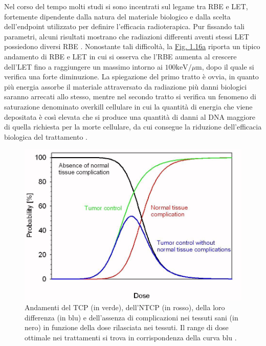 \documentclass[12pt,a4paper,twoside]{report}
\begin{document}
	Nel corso del tempo molti studi si sono incentrati sul legame tra RBE e LET, fortemente dipendente dalla natura del materiale biologico e dalla scelta dell'endpoint utilizzato per definire l'efficacia radioterapica. Pur fissando tali parametri, alcuni risultati mostrano che radiazioni differenti aventi stessi LET possiedono diversi RBE \cite{jicru}. Nonostante tali difficoltà, la \hyperref[fig:let_rbe]{Fig. 1.16a} riporta un tipico andamento di RBE e LET in cui si osserva che l'RBE aumenta al crescere dell'LET fino a raggiungere un massimo intorno ai $100\mbox{keV}/\mu\mbox{m}$, dopo il quale si verifica una forte diminuzione. La spiegazione del primo tratto è ovvia, in quanto più energia assorbe il materiale attraversato da radiazione più danni biologici saranno arrecati allo stesso, mentre nel secondo tratto si verifica un fenomeno di saturazione denominato overkill cellulare in cui la quantità di energia che viene depositata è così elevata che si produce una quantità di danni al DNA maggiore di quella richiesta per la morte cellulare, da cui consegue la riduzione dell'efficacia biologica del trattamento \cite{linz2011ion}.
	\begin{figure}[H]
		\centering
		\includegraphics[width=0.9\linewidth]{tcp.jpg}
		\caption{Andamenti del TCP (in verde), dell'NTCP (in rosso), della loro differenza (in blu) e dell'assenza di complicazioni nei tessuti sani (in nero) in funzione della dose rilasciata nei tessuti. Il range di dose ottimale nei trattamenti si trova in corrispondenza della curva blu \cite{Jensen2019}.}
		\label{fig:tcp}
	\end{figure}
\end{document}
